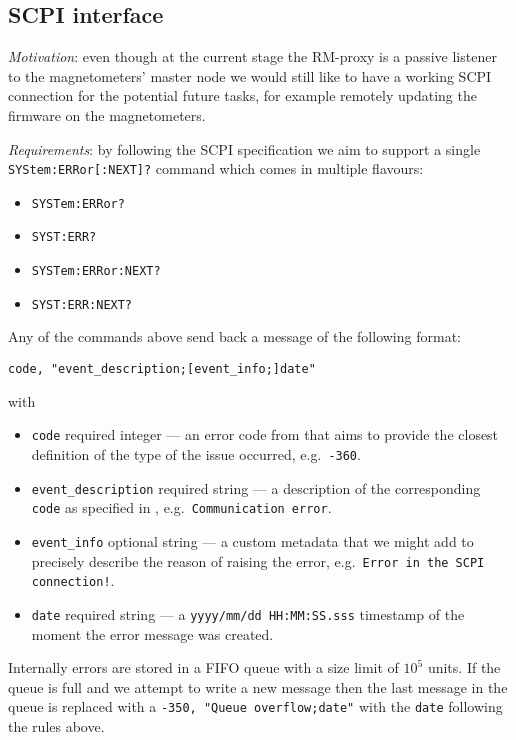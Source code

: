 \subsection{SCPI interface}
\label{subsec:rm-proxy_scpi}

\textit{Motivation}: even though at the current stage the RM-proxy is a passive listener to the magnetometers' master node we would still like to have a working SCPI connection for the potential future tasks, for example remotely updating the firmware on the magnetometers.

\textit{Requirements}: by following the SCPI specification \cite{SCPIConsortium1999} we aim to support a single \texttt{SYStem:ERRor[:NEXT]?} command which comes in multiple flavours:

\begin{itemize}
	\item \texttt{SYSTem:ERRor?}
	\item \texttt{SYST:ERR?}
	\item \texttt{SYSTem:ERRor:NEXT?}
	\item \texttt{SYST:ERR:NEXT?}
\end{itemize}

Any of the commands above send back a message of the following format:
\begin{verbatim}
code, "event_description;[event_info;]date"
\end{verbatim}
with
\begin{itemize}
	\item \texttt{code} required integer --- an error code from \cite{SCPIConsortium1999} that aims to provide the closest definition of the type of the issue occurred, e.g.\ \texttt{-360}.
	\item \texttt{event\_description} required string --- a description of the corresponding \texttt{code} as specified in \cite{SCPIConsortium1999}, e.g.\ \texttt{Communication error}.
	\item \texttt{event\_info} optional string --- a custom metadata that we might add to precisely describe the reason of raising the error, e.g.\ \texttt{Error in the SCPI connection!}.
	\item \texttt{date} required string --- a \texttt{yyyy/mm/dd HH:MM:SS.sss} timestamp \cite{SCPIConsortium1999} of the moment the error message was created.
\end{itemize}

Internally errors are stored in a FIFO queue with a size limit of $10^5$ units. If the queue is full and we attempt to write a new message then the last message in the queue is replaced with a \texttt{-350, "Queue overflow;date"} with the \texttt{date} following the rules above.

